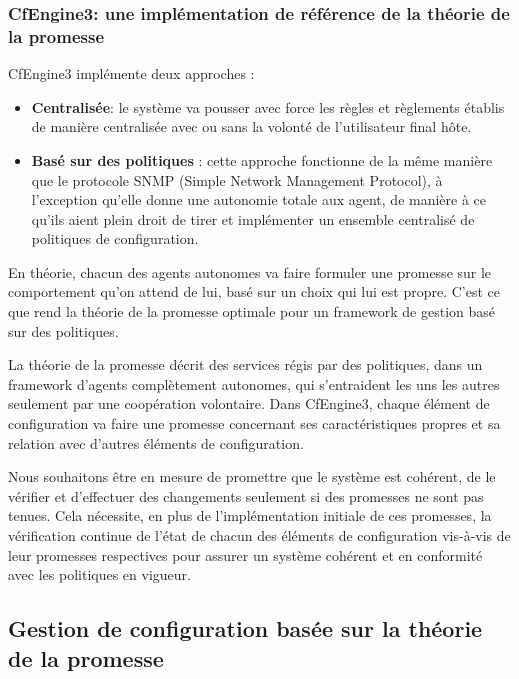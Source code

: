 \subsubsection{CfEngine3: une implémentation de référence de la théorie de la
promesse}

CfEngine3 implémente deux approches :

\begin{itemize}
    \item \textbf{Centralisée}: 
        le système va pousser avec force les règles et règlements établis de
        manière centralisée avec ou sans la volonté de l'utilisateur final hôte.
    \item \textbf{Basé sur des politiques} :
        cette approche fonctionne de la même manière que le protocole SNMP
        (Simple Network Management Protocol), à l'exception qu'elle donne une
        autonomie totale aux agent, de manière à ce qu'ils aient plein droit de
        tirer et implémenter un ensemble centralisé de politiques de
        configuration.
\end{itemize}

En théorie, chacun des agents autonomes va faire formuler une promesse sur le
comportement qu'on attend de lui, basé sur un choix qui lui est propre. C'est ce
que rend la théorie de la promesse optimale pour un framework de gestion basé
sur des politiques.

La théorie de la promesse décrit des services régis par des politiques, dans un
framework d'agents complètement autonomes, qui s'entraident les uns les autres
seulement par une coopération volontaire. Dans CfEngine3, chaque élément de
configuration va faire une promesse concernant ses caractéristiques propres et
sa relation avec d'autres éléments de configuration.

Nous souhaitons être en mesure de promettre que le système est cohérent, de le
vérifier et d'effectuer des changements seulement si des promesses ne sont pas
tenues. Cela nécessite, en plus de l'implémentation initiale de ces promesses,
la vérification continue de l'état de chacun des éléments de configuration
vis-à-vis de leur promesses respectives pour assurer un système cohérent et en
conformité avec les politiques en vigueur.


\subsection{Gestion de configuration basée sur la théorie de la promesse}

